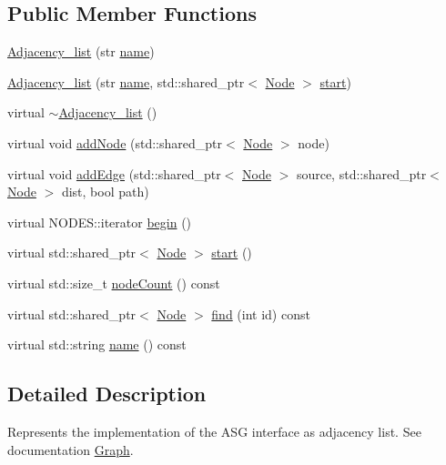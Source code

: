 \subsection*{Public Member Functions}
\begin{DoxyCompactItemize}
\item 
\hyperlink{classAdjacency__list_a7d5d3a9d4e555a56303fa9facc54f0ba}{Adjacency\-\_\-list} (str \hyperlink{classAdjacency__list_ab2eea0405522e8b9917d84ef44e70f66}{name})
\item 
\hyperlink{classAdjacency__list_a2a98e4275df4dc38fbfcdf84ec5ced7d}{Adjacency\-\_\-list} (str \hyperlink{classAdjacency__list_ab2eea0405522e8b9917d84ef44e70f66}{name}, std\-::shared\-\_\-ptr$<$ \hyperlink{structNode}{Node} $>$ \hyperlink{classAdjacency__list_a129aec8db0fc3b6109de60f765c41ac4}{start})
\item 
virtual \hyperlink{classAdjacency__list_a1eeb2fe43e777799b553b29135bcafd0}{$\sim$\-Adjacency\-\_\-list} ()
\item 
virtual void \hyperlink{classAdjacency__list_adbc9e5768336f17f7442638e5284f2a7}{add\-Node} (std\-::shared\-\_\-ptr$<$ \hyperlink{structNode}{Node} $>$ node)
\item 
virtual void \hyperlink{classAdjacency__list_a43a6325bc1e122a2675c39ea826f5f2a}{add\-Edge} (std\-::shared\-\_\-ptr$<$ \hyperlink{structNode}{Node} $>$ source, std\-::shared\-\_\-ptr$<$ \hyperlink{structNode}{Node} $>$ dist, bool path)
\item 
virtual N\-O\-D\-E\-S\-::iterator \hyperlink{classAdjacency__list_aca86880551fe5df685606de3a8ea0710}{begin} ()
\item 
virtual std\-::shared\-\_\-ptr$<$ \hyperlink{structNode}{Node} $>$ \hyperlink{classAdjacency__list_a129aec8db0fc3b6109de60f765c41ac4}{start} ()
\item 
virtual std\-::size\-\_\-t \hyperlink{classAdjacency__list_ac67e271d3a734fc596d678490101b509}{node\-Count} () const 
\item 
virtual std\-::shared\-\_\-ptr$<$ \hyperlink{structNode}{Node} $>$ \hyperlink{classAdjacency__list_aa15c2f8c06d2d3eee4e2f04002b728ab}{find} (int id) const 
\item 
virtual std\-::string \hyperlink{classAdjacency__list_ab2eea0405522e8b9917d84ef44e70f66}{name} () const 
\end{DoxyCompactItemize}


\subsection{Detailed Description}
Represents the implementation of the A\-S\-G interface as adjacency list. See documentation \hyperlink{classGraph}{Graph}.

